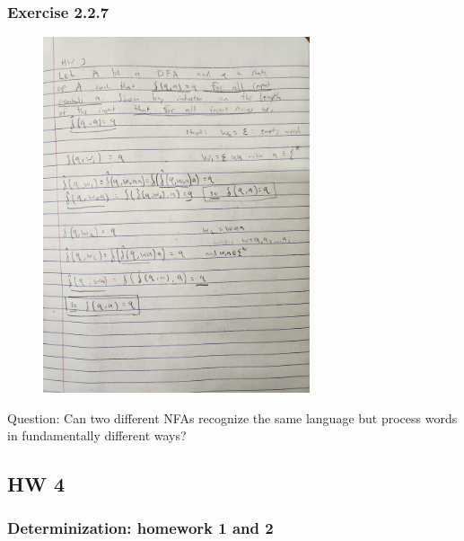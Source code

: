\documentclass{article}
\theoremstyle{theorem}
\theoremstyle{definition}
\theoremstyle{remark}
\begin{document}
\subsubsection{Exercise 2.2.7}
\begin{figure}[H]
    \centering
    \includegraphics[angle=-90, width=0.7\textwidth]{latexImages/hw3-2.jpg} 
\end{figure}

Question: Can two different NFAs recognize the same language but process words in fundamentally different ways?

\subsection{HW 4}

\subsubsection{Determinization: homework 1 and 2}
\end{document}
